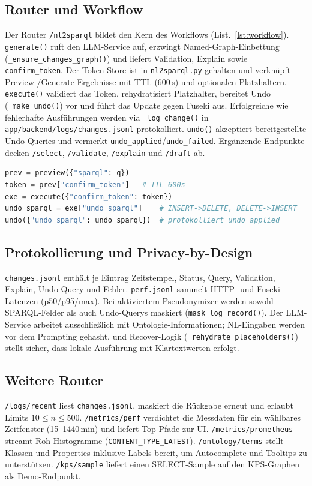 \subsection{Router und Workflow}
Der Router \texttt{/nl2sparql} bildet den Kern des Workflows (List.~\ref{lst:workflow}). \texttt{generate()} ruft den LLM-Service auf, erzwingt Named-Graph-Einbettung (\texttt{\_ensure\_changes\_graph()}) und liefert Validation, Explain sowie \texttt{confirm\_token}. Der Token-Store ist in \texttt{nl2sparql.py} gehalten und verknüpft Preview-/Generate-Ergebnisse mit TTL (600\,s) und optionalen Platzhaltern. \texttt{execute()} validiert das Token, rehydratisiert Platzhalter, bereitet Undo (\texttt{\_make\_undo()}) vor und führt das Update gegen Fuseki aus. Erfolgreiche wie fehlerhafte Ausführungen werden via \texttt{\_log\_change()} in \texttt{app/backend/logs/changes.jsonl} protokolliert. \texttt{undo()} akzeptiert bereitgestellte Undo-Queries und vermerkt \texttt{undo\_applied}/\texttt{undo\_failed}. Ergänzende Endpunkte decken \texttt{/select}, \texttt{/validate}, \texttt{/explain} und \texttt{/draft} ab.

\begin{lstlisting}[language=python,caption={Ablauf \texttt{Preview}→\texttt{Execute} mit Token und Undo},label={lst:workflow}]
prev = preview({"sparql": q})
token = prev["confirm_token"]   # TTL 600s
exe = execute({"confirm_token": token})
undo_sparql = exe["undo_sparql"]    # INSERT->DELETE, DELETE->INSERT
undo({"undo_sparql": undo_sparql})  # protokolliert undo_applied
\end{lstlisting}

\subsection{Protokollierung und Privacy-by-Design}
\texttt{changes.jsonl} enthält je Eintrag Zeitstempel, Status, Query, Validation, Explain, Undo-Query und Fehler. \texttt{perf.jsonl} sammelt HTTP- und Fuseki-Latenzen (p50/p95/max). Bei aktiviertem Pseudonymizer werden sowohl SPARQL-Felder als auch Undo-Querys maskiert (\texttt{mask\_log\_record()}). Der LLM-Service arbeitet ausschließlich mit Ontologie-Informationen; NL-Eingaben werden vor dem Prompting gehasht, und Recover-Logik (\texttt{\_rehydrate\_placeholders()}) stellt sicher, dass lokale Ausführung mit Klartextwerten erfolgt.

\subsection{Weitere Router}
\texttt{/logs/recent} liest \texttt{changes.jsonl}, maskiert die Rückgabe erneut und erlaubt Limits \(10\leq n\leq 500\). \texttt{/metrics/perf} verdichtet die Messdaten für ein wählbares Zeitfenster (15–1440\,min) und liefert Top-Pfade zur UI. \texttt{/metrics/prometheus} streamt Roh-Histogramme (\texttt{CONTENT\_TYPE\_LATEST}). \texttt{/ontology/terms} stellt Klassen und Properties inklusive Labels bereit, um Autocomplete und Tooltips zu unterstützen. \texttt{/kps/sample} liefert einen SELECT-Sample auf den KPS-Graphen als Demo-Endpunkt.

